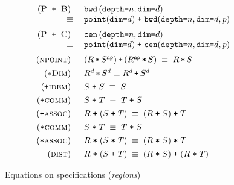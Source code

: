 \documentclass[10pt,preprint]{sigplanconf}
\theoremstyle{definition}
\newcommand{\term}[1]{\texttt{#1}}
\newcommand{\stenBwdS}[2]{\term{bwd} \, (\term{depth=}#1,
  \term{dim=}#2)}
\newcommand{\stenCenS}[2]{\term{cen} \, (\term{depth=}#1,
  \term{dim=}#2)}
\newcommand{\irreflS}{\texttt{np}}
\newcommand{\stenBwdSR}[3]{\term{bwd} (\term{depth=}#1,
  \term{dim=}#2, #3)}
\newcommand{\stenCenSR}[3]{\term{cen} (\term{depth=}#1,
  \term{dim=}#2, #3)}
\newcommand{\stenReflSR}[1]{\term{point} (\term{dim=}#1)}
\begin{document}
\begin{figure}
\begin{align*}
\begin{array}{c}
\begin{array}{rll}
%
%
(\textsc{P\, \texttt{+} \,B}) \;\; &
\stenBwdS{n}{d} \\
\equiv \; & \stenReflSR{d} \; \texttt{+} \; \stenBwdSR{n}{d}{p} \\[0.6em]
%
%
(\textsc{P\, \texttt{+} \,C}) \;\; &
\stenCenS{n}{d} \\
\equiv \; & \stenReflSR{d} \; \texttt{+} \; \stenCenSR{n}{d}{p} \\[0.6em]
%
%
(\textsc{npoint}) \;\; & (R \, \term{*} \, S^\irreflS) \, \term{+} \,
                         (R^\irreflS \, \term{*} \, S) \;
\equiv \; R \, \term{*} \, S \\[0.4em]
%
(\textsc{$\ast$Dim}) \;\; & R^d \, \term{$\ast$} \, S^d \equiv R^d
                             \, \term{+} \, S^d \\[0.4em]
%
(\texttt{+}\textsc{idem}) \;\; & S \; \texttt{+} \; S \; \equiv \; S \\[0.4em]
%
(\texttt{+}\textsc{comm}) \;\; & S \; \texttt{+} \; T \; \equiv \; T \;
                       \texttt{+} \; S \\[0.4em]
%
(\texttt{+}\textsc{assoc}) \;\; & R \; \texttt{+} \; (S \; \texttt{+} \; T) \; \equiv \; (R \;
                       \texttt{+} \; S) \; \texttt{+} \; T \\[0.4em]
(\texttt{*}\textsc{comm}) \;\; & S \; \texttt{*} \; T \; \equiv \; T \;
                       \texttt{*} \; S \\[0.4em]
%
(\texttt{*}\textsc{assoc}) \;\; & R \; \texttt{*} \; (S \; \texttt{*} \; T) \; \equiv \; (R \;
                       \texttt{*} \; S) \; \texttt{*} \; T \\[0.4em]
(\textsc{dist}) \;\; & R \; \texttt{*} \; (S \; \texttt{+} \; T) \; \equiv \; (R \;
                       \texttt{*} \; S) \; \texttt{+} \; (R
                       \; \texttt{*} \; T)
\end{array}
\end{array}
\end{align*}
\caption{Equations on specifications (\emph{regions})}
\vspace{-0.5em}
\label{fig:equations}
\end{figure}
\end{document}
